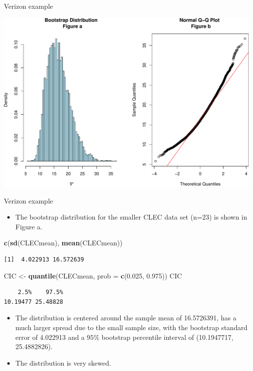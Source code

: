\documentclass[
  ignorenonframetext,
]{beamer}
\newenvironment{Shaded}{\begin{snugshade}}{\end{snugshade}}
\newcommand{\AttributeTok}[1]{\textcolor[rgb]{0.13,0.29,0.53}{#1}}
\newcommand{\FloatTok}[1]{\textcolor[rgb]{0.00,0.00,0.81}{#1}}
\newcommand{\FunctionTok}[1]{\textcolor[rgb]{0.13,0.29,0.53}{\textbf{#1}}}
\newcommand{\NormalTok}[1]{#1}
\newcommand{\OtherTok}[1]{\textcolor[rgb]{0.56,0.35,0.01}{#1}}
\providecommand{\tightlist}{%
  \setlength{\itemsep}{0pt}\setlength{\parskip}{0pt}}
\begin{document}
\begin{frame}[fragile]{Verizon example}
\begin{center}\includegraphics[width=0.6\linewidth,height=0.35\textheight]{Week10_Lect_files/figure-beamer/unnamed-chunk-37-1} \end{center}
\normalsize
\end{frame}

\begin{frame}[fragile]{Verizon example}
\protect\hypertarget{verizon-example-5}{}
\begin{itemize}
\tightlist
\item
  The bootstrap distribution for the smaller CLEC data set (n=23) is
  shown in Figure a.
\end{itemize}

\small

\begin{Shaded}
\begin{Highlighting}[]
\FunctionTok{c}\NormalTok{(}\FunctionTok{sd}\NormalTok{(CLECmean), }\FunctionTok{mean}\NormalTok{(CLECmean))}
\end{Highlighting}
\end{Shaded}

\begin{verbatim}
[1]  4.022913 16.572639
\end{verbatim}

\begin{Shaded}
\begin{Highlighting}[]
\NormalTok{CIC }\OtherTok{\textless{}{-}} \FunctionTok{quantile}\NormalTok{(CLECmean, }\AttributeTok{prob =} \FunctionTok{c}\NormalTok{(}\FloatTok{0.025}\NormalTok{, }\FloatTok{0.975}\NormalTok{))}
\NormalTok{CIC}
\end{Highlighting}
\end{Shaded}

\begin{verbatim}
    2.5%    97.5% 
10.19477 25.48828 
\end{verbatim}

\normalsize

\begin{itemize}
\tightlist
\item
  The distribution is centered around the sample mean of 16.5726391, has
  a much larger spread due to the small sample size, with the bootstrap
  standard error of 4.022913 and a \(95\%\) bootstrap percentile
  interval of (10.1947717, 25.4882826).
\item
  The distribution is very skewed.
\end{itemize}
\end{frame}
\end{document}
